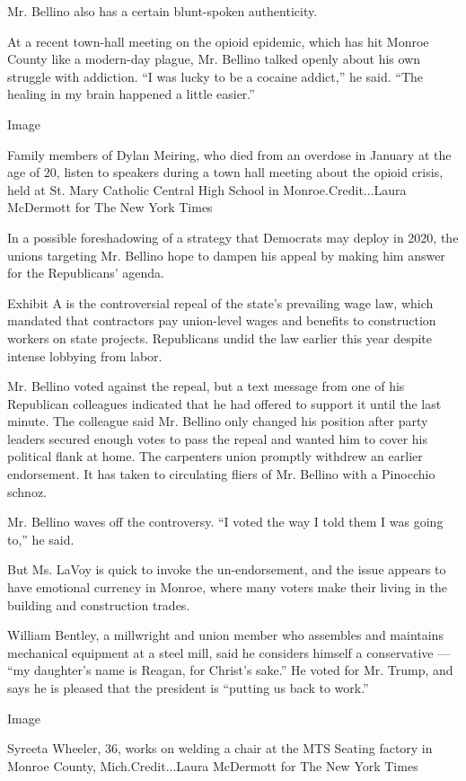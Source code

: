 Mr. Bellino also has a certain blunt-spoken authenticity.

At a recent town-hall meeting on the opioid epidemic, which has hit
Monroe County like a modern-day plague, Mr. Bellino talked openly about
his own struggle with addiction. ``I was lucky to be a cocaine addict,''
he said. ``The healing in my brain happened a little easier.''

Image

Family members of Dylan Meiring, who died from an overdose in January at
the age of 20, listen to speakers during a town hall meeting about the
opioid crisis, held at St. Mary Catholic Central High School in
Monroe.Credit...Laura McDermott for The New York Times

In a possible foreshadowing of a strategy that Democrats may deploy in
2020, the unions targeting Mr. Bellino hope to dampen his appeal by
making him answer for the Republicans' agenda.

Exhibit A is the controversial repeal of the state's prevailing wage
law, which mandated that contractors pay union-level wages and benefits
to construction workers on state projects. Republicans undid the law
earlier this year despite intense lobbying from labor.

Mr. Bellino voted against the repeal, but a text message from one of his
Republican colleagues indicated that he had offered to support it until
the last minute. The colleague said Mr. Bellino only changed his
position after party leaders secured enough votes to pass the repeal and
wanted him to cover his political flank at home. The carpenters union
promptly withdrew an earlier endorsement. It has taken to circulating
fliers of Mr. Bellino with a Pinocchio schnoz.

Mr. Bellino waves off the controversy. ``I voted the way I told them I
was going to,'' he said.

But Ms. LaVoy is quick to invoke the un-endorsement, and the issue
appears to have emotional currency in Monroe, where many voters make
their living in the building and construction trades.

William Bentley, a millwright and union member who assembles and
maintains mechanical equipment at a steel mill, said he considers
himself a conservative --- ``my daughter's name is Reagan, for Christ's
sake.'' He voted for Mr. Trump, and says he is pleased that the
president is ``putting us back to work.''

Image

Syreeta Wheeler, 36, works on welding a chair at the MTS Seating factory
in Monroe County, Mich.Credit...Laura McDermott for The New York Times

